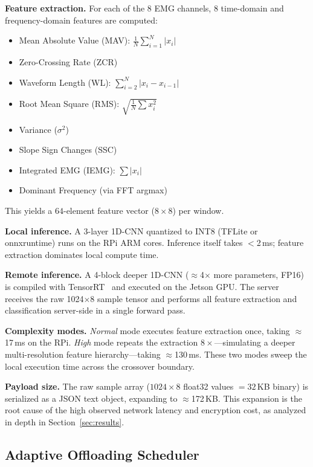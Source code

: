 \documentclass[10pt,twocolumn]{article}
\begin{document}
\textbf{Feature extraction.}  For each of the 8 EMG channels, 8 time-domain
and frequency-domain features are computed:
\begin{itemize}[leftmargin=1.5em,noitemsep]
    \item Mean Absolute Value (MAV): $\frac{1}{N}\sum_{i=1}^{N}|x_i|$
    \item Zero-Crossing Rate (ZCR)
    \item Waveform Length (WL): $\sum_{i=2}^{N}|x_i - x_{i-1}|$
    \item Root Mean Square (RMS): $\sqrt{\frac{1}{N}\sum x_i^2}$
    \item Variance ($\sigma^2$)
    \item Slope Sign Changes (SSC)
    \item Integrated EMG (IEMG): $\sum|x_i|$
    \item Dominant Frequency (via FFT argmax)
\end{itemize}
This yields a $64$-element feature vector ($8 \times 8$) per window.

\textbf{Local inference.}  A 3-layer 1D-CNN quantized to INT8 (TFLite or
onnxruntime) runs on the RPi ARM cores.  Inference itself takes $<$2\,ms;
feature extraction dominates local compute time.

\textbf{Remote inference.}  A 4-block deeper 1D-CNN ($\approx$4$\times$ more
parameters, FP16) is compiled with TensorRT~\cite{tensorrt, jeong2022tensorrt}
and executed on the Jetson GPU.  The server receives the raw 1024$\times$8
sample tensor and performs all feature extraction and classification
server-side in a single forward pass.

\textbf{Complexity modes.}  \emph{Normal} mode executes feature extraction
once, taking $\approx$17\,ms on the RPi.  \emph{High} mode repeats the
extraction $8\times$—simulating a deeper multi-resolution feature
hierarchy—taking $\approx$130\,ms.  These two modes sweep the local execution
time across the crossover boundary.

\textbf{Payload size.}  The raw sample array ($1024 \times 8$ float32 values
$= 32$\,KB binary) is serialized as a JSON text object, expanding to
$\approx$172\,KB.  This expansion is the root cause of the high observed
network latency and encryption cost, as analyzed in depth in
Section~\ref{sec:results}.

\subsection{Adaptive Offloading Scheduler}
\end{document}
